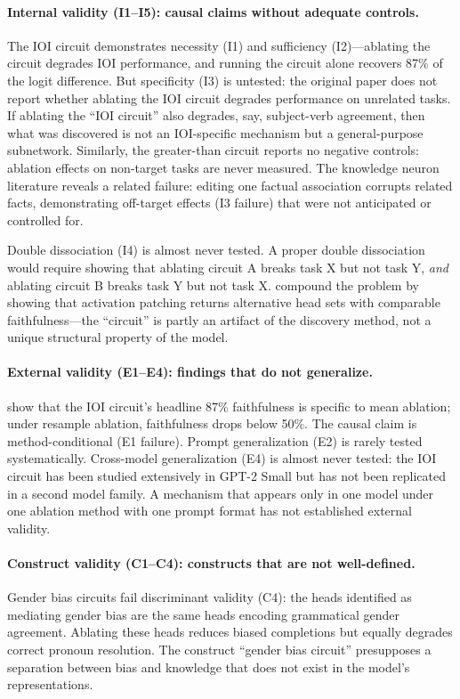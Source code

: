 \documentclass[10pt]{article}
\begin{document}
\paragraph{Internal validity (I1--I5): causal claims without adequate controls.}
The IOI circuit demonstrates necessity (I1) and sufficiency (I2)---ablating the circuit degrades IOI performance, and running the circuit alone recovers 87\% of the logit difference. But specificity (I3) is untested: the original paper does not report whether ablating the IOI circuit degrades performance on unrelated tasks. If ablating the ``IOI circuit'' also degrades, say, subject-verb agreement, then what was discovered is not an IOI-specific mechanism but a general-purpose subnetwork. Similarly, the greater-than circuit \citep{hanna2023greater} reports no negative controls: ablation effects on non-target tasks are never measured. The knowledge neuron literature \citep{dai2022knowledge} reveals a related failure: editing one factual association corrupts related facts, demonstrating off-target effects (I3 failure) that were not anticipated or controlled for.

Double dissociation (I4) is almost never tested. A proper double dissociation would require showing that ablating circuit A breaks task X but not task Y, \emph{and} ablating circuit B breaks task Y but not task X. \citet{meloux2025everything} compound the problem by showing that activation patching returns alternative head sets with comparable faithfulness---the ``circuit'' is partly an artifact of the discovery method, not a unique structural property of the model.

\paragraph{External validity (E1--E4): findings that do not generalize.}
\citet{miller2024transformer} show that the IOI circuit's headline 87\% faithfulness is specific to mean ablation; under resample ablation, faithfulness drops below 50\%. The causal claim is method-conditional (E1 failure). Prompt generalization (E2) is rarely tested systematically. Cross-model generalization (E4) is almost never tested: the IOI circuit has been studied extensively in GPT-2 Small but has not been replicated in a second model family. A mechanism that appears only in one model under one ablation method with one prompt format has not established external validity.

\paragraph{Construct validity (C1--C4): constructs that are not well-defined.}
Gender bias circuits \citep{vig2020gender} fail discriminant validity (C4): the heads identified as mediating gender bias are the same heads encoding grammatical gender agreement. Ablating these heads reduces biased completions but equally degrades correct pronoun resolution. The construct ``gender bias circuit'' presupposes a separation between bias and knowledge that does not exist in the model's representations.
\end{document}
